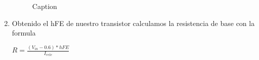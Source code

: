 \documentclass[letterpaper]{article}
\begin{document}
\begin{large}
\begin{enumerate}
        \begin{figure}[htbp]
            \centering
            \caption{Caption}
            \label{fig:my_label}
        \end{figure}
        
        \item Obtenido el hFE de nuestro transistor calculamos la resistencia de base con la formula\\
            \begin{large}
                \begin{center}
                $R = \frac{(V_{in}-0.6)*hFE}{I_{rele}}$ 
                \end{center} 
            

\end{large}
\end{enumerate}
\end{large}
\end{document}
